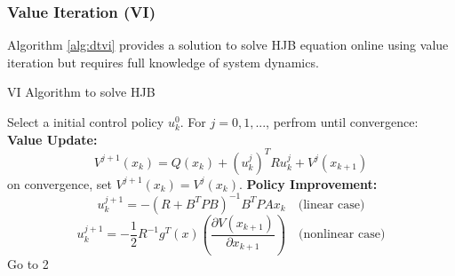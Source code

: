 \documentclass[conference]{IEEEtran}
\begin{document}
\subsubsection{Value Iteration (VI)}
Algorithm \ref{alg:dtvi} provides a solution to solve HJB equation online using value iteration but requires full knowledge of system dynamics.
\begin{algorithm}
	\caption{VI Algorithm to solve HJB}
	\label{alg:dtvi}
	\begin{algorithmic}[1]
		\STATE Select a initial control policy \(u^0_k\).
		\STATE For \(j=0,1, ...\), perfrom until convergence: \\
		 \textbf{Value Update:}
		 \[
		  V^{j+1}(x_k) = Q(x_k) + (u^j_k)^TRu^j_k + V^{j}(x_{k+1})\]
		  on convergence, set \(V^{j+1}(x_k)=V^j(x_k)\).
		\STATE \textbf{Policy Improvement:}
		\[u^{j+1}_k = -(R+B^TPB)^{-1}B^TPAx_k\quad\text{(linear case)}\] 
		\[u^{j+1}_k = -\frac{1}{2}R^{-1}g^{T}(x)(\frac{\partial{V(x_{k+1})}}{\partial{x_{k+1}}})\quad\text{(nonlinear case)}\] 
		\STATE Go to 2
	\end{algorithmic}
\end{algorithm}
\end{document}
